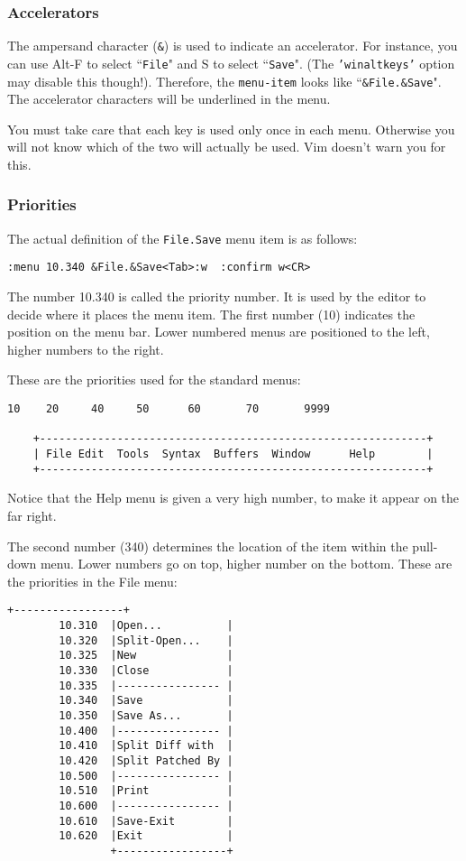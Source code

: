 \subsubsection{Accelerators}
The ampersand character (\texttt{\&}) is used to indicate an accelerator.
For instance, you can use Alt-F to select ``\texttt{File}" and S to select ``\texttt{Save}".
(The \texttt{'winaltkeys'} option may disable this though!).
Therefore, the \texttt{{menu-item}} looks like ``\texttt{\&File.\&Save}".
The accelerator characters will be underlined in the menu.

You must take care that each key is used only once in each menu.
Otherwise you will not know which of the two will actually be used.
Vim doesn't warn you for this.

\subsubsection{Priorities}
The actual definition of the \texttt{File.Save} menu item is as follows:

\begin{Verbatim}[samepage=true]
 :menu 10.340 &File.&Save<Tab>:w  :confirm w<CR>
\end{Verbatim}

The number 10.340 is called the priority number.
It is used by the editor to decide where it places the menu item.
The first number (10) indicates the position on the menu bar.
Lower numbered menus are positioned to the left, higher numbers to the right.

These are the priorities used for the standard menus:

\begin{Verbatim}[samepage=true]
      10    20     40     50      60       70       9999

    +------------------------------------------------------------+
    | File Edit  Tools  Syntax  Buffers  Window      Help        |
    +------------------------------------------------------------+
\end{Verbatim}

Notice that the Help menu is given a very high number, to make it appear on the far right.

The second number (340) determines the location of the item within the pull-down menu.
Lower numbers go on top, higher number on the bottom.
These are the priorities in the File menu:

\begin{Verbatim}[samepage=true]
                +-----------------+
        10.310  |Open...          |
        10.320  |Split-Open...    |
        10.325  |New              |
        10.330  |Close            |
        10.335  |---------------- |
        10.340  |Save             |
        10.350  |Save As...       |
        10.400  |---------------- |
        10.410  |Split Diff with  |
        10.420  |Split Patched By |
        10.500  |---------------- |
        10.510  |Print            |
        10.600  |---------------- |
        10.610  |Save-Exit        |
        10.620  |Exit             |
                +-----------------+
\end{Verbatim}

